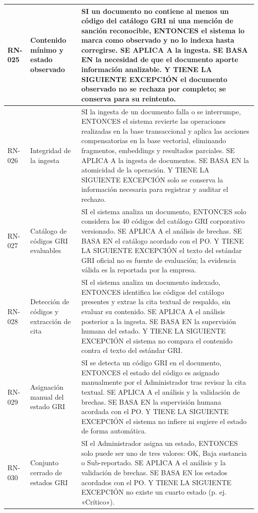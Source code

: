 \begin{longtable}{|C{1.4cm}|L{4.0cm}|L{9.4cm}|}
\hline
RN-025 & Contenido mínimo y estado observado & SI un documento no contiene al menos un código del catálogo GRI ni una mención de sanción reconocible, ENTONCES el sistema lo marca como observado y no lo indexa hasta corregirse. SE APLICA A la ingesta. SE BASA EN la necesidad de que el documento aporte información analizable. Y TIENE LA SIGUIENTE EXCEPCIÓN el documento observado no se rechaza por completo; se conserva para su reintento. \\
\hline
RN-026 & Integridad de la ingesta & SI la ingesta de un documento falla o se interrumpe, ENTONCES el sistema revierte las operaciones realizadas en la base transaccional y aplica las acciones compensatorias en la base vectorial, eliminando fragmentos, embeddings y resultados parciales. SE APLICA A la ingesta de documentos. SE BASA EN la atomicidad de la operación. Y TIENE LA SIGUIENTE EXCEPCIÓN solo se conserva la información necesaria para registrar y auditar el rechazo. \\
\hline
RN-027 & Catálogo de códigos GRI evaluables & SI el sistema analiza un documento, ENTONCES solo considera los 40 códigos del catálogo GRI corporativo versionado. SE APLICA A el análisis de brechas. SE BASA EN el catálogo acordado con el PO. Y TIENE LA SIGUIENTE EXCEPCIÓN el texto del estándar GRI oficial no es fuente de evaluación; la evidencia válida es la reportada por la empresa. \\
\hline
RN-028 & Detección de códigos y extracción de cita & SI el sistema analiza un documento indexado, ENTONCES identifica los códigos del catálogo presentes y extrae la cita textual de respaldo, sin evaluar su contenido. SE APLICA A el análisis posterior a la ingesta. SE BASA EN la supervisión humana del estado. Y TIENE LA SIGUIENTE EXCEPCIÓN el sistema no compara el contenido contra el texto del estándar GRI. \\
\hline
RN-029 & Asignación manual del estado GRI & SI se detecta un código GRI en el documento, ENTONCES el estado del código es asignado manualmente por el Administrador tras revisar la cita textual. SE APLICA A el análisis y la validación de brechas. SE BASA EN la supervisión humana acordada con el PO. Y TIENE LA SIGUIENTE EXCEPCIÓN el sistema no infiere ni sugiere el estado de forma automática. \\
\hline
RN-030 & Conjunto cerrado de estados GRI & SI el Administrador asigna un estado, ENTONCES solo puede ser uno de tres valores: OK, Baja sustancia o Sub-reportado. SE APLICA A el análisis y la validación de brechas. SE BASA EN los estados acordados con el PO. Y TIENE LA SIGUIENTE EXCEPCIÓN no existe un cuarto estado (p. ej. «Crítico»). \\

\end{longtable}
